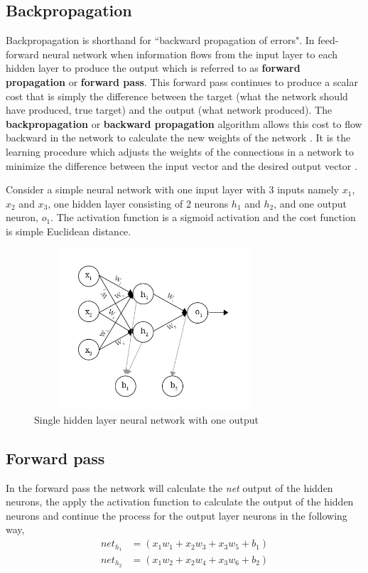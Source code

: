 \subsection{Backpropagation}\label{backprop}
Backpropagation is shorthand for ``backward propagation of errors". In feed-forward neural network when information flows from the input layer to each hidden layer to produce the output which is referred to as \textbf{forward propagation} or \textbf{forward pass}. This forward pass continues to produce a scalar cost that is simply the difference between the target (what the network should have produced, true target) and the output (what network produced). The \textbf{backpropagation} or \textbf{backward propagation} algorithm allows this cost to flow backward in the network to calculate the new weights of the network \cite{goodfellow2016deep}. It is the learning procedure which adjusts the weights of the connections in a network to minimize the difference between the input vector and the desired output vector \cite{rumelhart1988learning}.

Consider a simple neural network with one input layer with 3 inputs namely $x_{1}$, $x_{2}$ and $x_{3}$, one hidden layer consisting of 2 neurons $h_{1}$ and $h_{2}$, and one output neuron, $o_{1}$. The activation function is a sigmoid activation and the cost function is simple Euclidean distance. 

\begin{figure}[!ht]
    \centering
    \includegraphics[width=9cm, height=6cm, keepaspectratio]{pics/backprop1.jpg}
    \caption{Single hidden layer neural network with one output}
    \label{fig:backPropExample}
\end{figure}

\subsection*{Forward pass}
In the forward pass the network will calculate the \textit{net} output of the hidden neurons, the apply the activation function to calculate the output of the hidden neurons and continue the process for the output layer neurons in the following way,
\begin{align}
    net_{h_{1}} &= (x_{1}w_{1}+x_{2}w_{3}+x_{3}w_{5}+b_{1})\\
    net_{h_{2}} &= (x_{1}w_{2}+x_{2}w_{4}+x_{3}w_{6}+b_{2})
\end{align}

